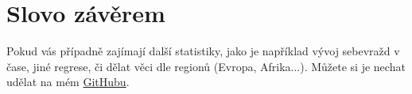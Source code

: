 \documentclass[12pt]{article}
\begin{document}
\section{Slovo závěrem}
Pokud vás případně zajímají další statistiky, jako je například vývoj sebevražd v čase, jiné regrese, či dělat věci dle regionů (Evropa, Afrika...). Můžete si je nechat udělat na mém \href{https://github.com/Desperadus/PaST-Zapoctak}{GitHubu}.

\renewcommand\refname{Reference}


\end{document}
